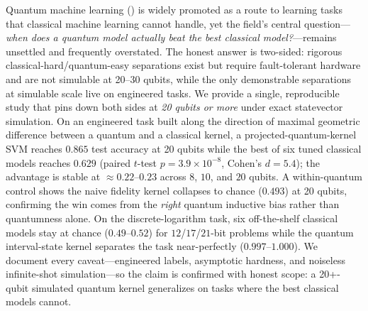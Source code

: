 Quantum machine learning (\qml) is widely promoted as a route to learning tasks
that classical machine learning cannot handle, yet the field's central
question---\emph{when does a quantum model actually beat the best classical
model?}---remains unsettled and frequently overstated. The honest answer is
two-sided: rigorous classical-hard/quantum-easy separations exist but require
fault-tolerant hardware and are not simulable at 20--30 qubits, while the only
demonstrable separations at simulable scale live on engineered tasks. We provide
a single, reproducible study that pins down both sides at \emph{20 qubits or
more} under exact statevector simulation. On an engineered task built along the
direction of maximal geometric difference between a quantum and a classical
kernel, a projected-quantum-kernel SVM reaches $0.865$ test accuracy at 20 qubits
while the best of six tuned classical models reaches $0.629$ (paired
$t$-test $p=3.9\times10^{-8}$, Cohen's $d=5.4$); the advantage is stable at
$\approx0.22$--$0.23$ across $8$, $10$, and $20$ qubits. A within-quantum control
shows the naive fidelity kernel collapses to chance ($0.493$) at 20 qubits,
confirming the win comes from the \emph{right} quantum inductive bias rather than
quantumness alone. On the discrete-logarithm task, six off-the-shelf classical
models stay at chance ($0.49$--$0.52$) for $12$/$17$/$21$-bit problems while the
quantum interval-state kernel separates the task near-perfectly
($0.997$--$1.000$). We document every caveat---engineered labels, asymptotic
hardness, and noiseless infinite-shot simulation---so the claim is confirmed with
honest scope: a 20+-qubit simulated quantum kernel generalizes on tasks where the
best classical models cannot.
